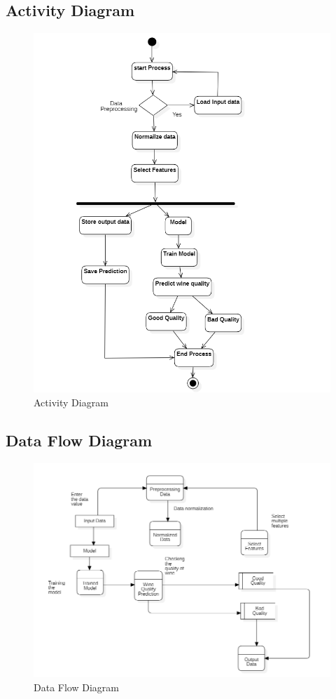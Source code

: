 \documentclass[a4paper, 12pt]{report}
\begin{document}
\subsection{Activity Diagram }
\begin{figure}[h]
\centering
\includegraphics[width=1\linewidth]{./WINE ACTIVITY DIAGRAM.png}
\caption{Activity Diagram}
\end{figure}
\pagebreak

\subsection{Data Flow Diagram }
\begin{figure}[h]
\centering
\includegraphics[width=0.9\linewidth]{./Wine DFD.png}
\caption{Data Flow Diagram}
\end{figure}
\pagebreak
\end{document}
